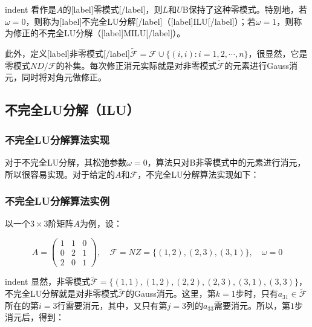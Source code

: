 \documentclass[UTF8,nofonts]{ctexart}
\begin{document}
indent 看作是$A$的[label]零模式[/label]，则$L$和$U$B保持了这种零模式。特别地，若$\omega=0$，则称为[label]不完全LU分解[/label]（[label]ILU[/label]）；若$\omega=1$，则称为修正的不完全LU分解（[label]MILU[/label]）。

此外，定义[label]非零模式[/label]$\tilde{\mathcal{F}}=\mathcal{F}\cup\{(i,i):i=1,2,\cdots,n\}$，很显然，它是零模式$ND/\mathcal{F}$的补集。每次修正消元实际就是对非零模式$\tilde{\mathcal{F}}$的元素进行Gauss消元，同时将对角元做修正。

\subsection*{不完全LU分解（ILU）}

\subsubsection*{不完全LU分解算法实现}

对于不完全LU分解，其松弛参数$\omega=0$，算法只对B非零模式中的元素进行消元，所以很容易实现。对于给定的$A$和$\mathcal{F}$，不完全LU分解算法实现如下：

\begin{algorithm}[H]
\end{algorithm}

\subsubsection*{不完全LU分解算法实例}

以一个$3 \times 3$阶矩阵$A$为例，设：

\[
A=\begin{pmatrix}1 & 1 & 0 \\ 0 & 2 & 1 \\ 2 & 0 & 1\end{pmatrix},\quad
\mathcal{F}=NZ=\Big\{(1,2),(2,3),(3,1)\Big\},\quad\omega=0
\]

indent 显然，非零模式$\tilde{\mathcal{F}}=\Big\{(1,1),(1,2),(2,2),(2,3),(3,1),(3,3)\Big\}$，不完全LU分解就是对非零模式$\tilde{\mathcal{F}}$的Gauss消元。这里，第$k=1$步时，只有$a_{31}\in\tilde{\mathcal{F}}$所在的第$i=3$行需要消元，其中，又只有第$j=3$列的$a_{33}$需要消元。所以，第$1$步消元后，得到：
\end{document}
